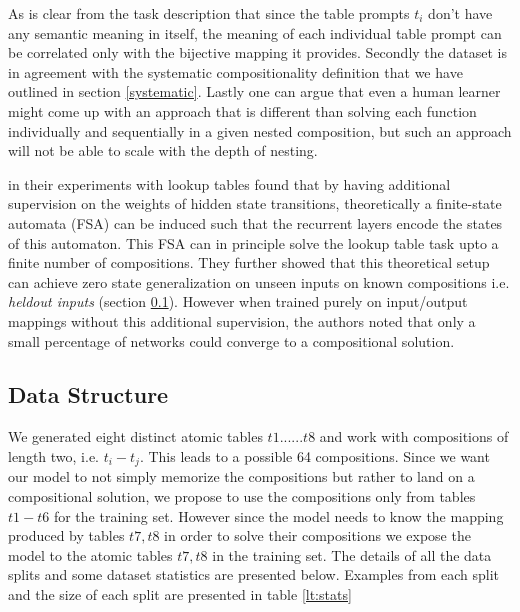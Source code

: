 As is clear from the task description that since the table prompts $t_i$ don't have any semantic meaning in itself, the meaning of each individual table prompt can be correlated only with the bijective mapping it provides. Secondly the dataset is in agreement with the systematic compositionality definition that we have outlined in section \ref{systematic}. Lastly one can argue that even a human learner might come up with an approach that is different than solving each function individually and sequentially in a given nested composition, but such an approach will not be able to scale with the depth of nesting.

\cite{Liska2018} in their experiments with lookup tables found that by having additional supervision on the weights of hidden state transitions, theoretically a finite-state automata (FSA) can be induced such that the recurrent layers encode the states of this automaton. This FSA can in principle solve the lookup table task upto a finite number of compositions. They further showed that this theoretical setup can achieve zero state generalization on unseen inputs on known compositions i.e. \textit{heldout inputs} (section \ref{lt:splits}). However when trained purely on input/output mappings without this additional supervision, the authors noted that only a small percentage of networks could converge to a compositional solution.


\subsection{Data Structure}\label{lt:splits}
We generated eight distinct atomic tables $t1......t8$ and work with compositions of length two, i.e. $t_i - t_j$. This leads to a possible 64 compositions. Since we want our model to not simply memorize the compositions but rather to land on a compositional solution, we propose to use the compositions only from tables $t1 - t6$ for the training set. However since the model needs to know the mapping produced by tables $t7, t8$ in order to solve their compositions we expose the model to the atomic tables $t7, t8$ in the training set. The details of all the data splits and some dataset statistics are presented below. Examples from each split and the size of each split are presented in table \ref{lt:stats}

